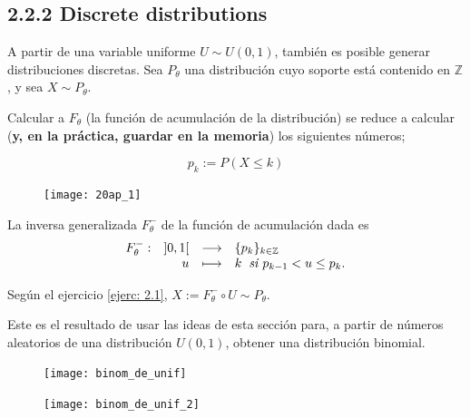 \subsection{2.2.2 Discrete distributions}

A partir de una variable uniforme
$U \sim U(0,1)$, también es posible generar distribuciones
discretas. Sea $P_{\theta}$ una distribución cuyo 
soporte está contenido en $\mathbb{Z}$, y sea
$X \sim P_{\theta}$.


Calcular a $F_{\theta}$ (la función de acumulación
de la distribución) se reduce a calcular 
(\textbf{y, en la práctica, guardar en la memoria})
los siguientes números;

\begin{equation}
\label{eq0: 20Ap}
p_{k} := P(X \leq k)
\end{equation}

\begin{figure}[H]
	\centering
	\texttt{[image: 20ap\_1]} 
\end{figure}	

La inversa generalizada $F_{\theta}^{-}$ de la función
de acumulación dada es
\[
\text{${\begin{array}{crcl} F_{\theta}^{-}: & ]0,1[ & \longrightarrow & \{ p_{k} \}_{k \in \mathbb{Z}}  \\ \, & u & \longmapsto & 
k \hspace{0.2cm} \textit{si } p_{k-1} < u \leq p_{k}.
 \end{array}}$}
\]

Según el ejercicio \ref{ejerc: 2.1},
$X:= F^{-}_{\theta} \circ U \sim P_{\theta}$.

\begin{ej}
Este es el resultado de usar las ideas de esta sección para,
a partir de números aleatorios de una distribución
$U(0,1)$, obtener una distribución binomial.
\end{ej}
\begin{figure}[H]
	\centering
	\texttt{[image: binom\_de\_unif]} 
\end{figure}	

\begin{figure}[H]
	\centering
	\texttt{[image: binom\_de\_unif\_2]} 
\end{figure}	

